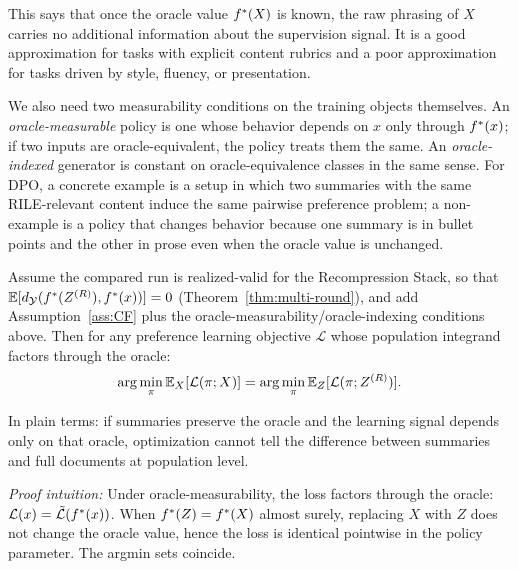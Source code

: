 This says that once the oracle value $f^\ast(X)$ is known, the raw phrasing of $X$ carries no additional information about the supervision signal. It is a good approximation for tasks with explicit content rubrics and a poor approximation for tasks driven by style, fluency, or presentation.

We also need two measurability conditions on the training objects themselves. An \emph{oracle-measurable} policy is one whose behavior depends on $x$ only through $f^\ast(x)$; if two inputs are oracle-equivalent, the policy treats them the same. An \emph{oracle-indexed} generator is constant on oracle-equivalence classes in the same sense. For DPO, a concrete example is a setup in which two summaries with the same RILE-relevant content induce the same pairwise preference problem; a non-example is a policy that changes behavior because one summary is in bullet points and the other in prose even when the oracle value is unchanged.

\begin{theorem}\label{thm:pref-equiv}
Assume the compared run is realized-valid for the Recompression Stack, so that $\mathbb{E}[d_{\mathcal{Y}}(f^\ast(Z^{(R)}), f^\ast(x))] = 0$ (Theorem~\ref{thm:multi-round}), and add Assumption~\ref{ass:CF} plus the oracle-measurability/oracle-indexing conditions above. Then for any preference learning objective $\mathcal{L}$ whose population integrand factors through the oracle:
\[
\arg\min_\pi \mathbb{E}_X[\mathcal{L}(\pi; X)] = \arg\min_\pi \mathbb{E}_Z[\mathcal{L}(\pi; Z^{(R)})].
\]
\end{theorem}

\noindent In plain terms: if summaries preserve the oracle and the learning signal depends only on that oracle, optimization cannot tell the difference between summaries and full documents at population level.

\noindent\textit{Proof intuition:} Under oracle-measurability, the loss factors through the oracle: $\mathcal{L}(x) = \tilde{\mathcal{L}}(f^\ast(x))$. When $f^\ast(Z) = f^\ast(X)$ almost surely, replacing $X$ with $Z$ does not change the oracle value, hence the loss is identical pointwise in the policy parameter. The argmin sets coincide.

